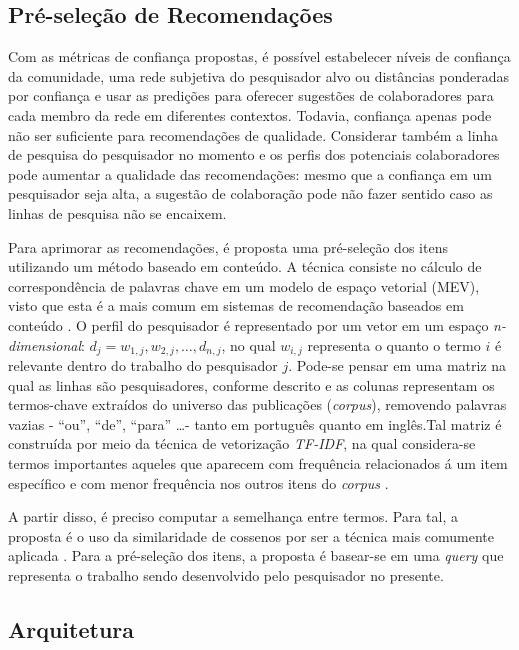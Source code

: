 \documentclass[12pt]{article}
\begin{document}
\subsection{Pré-seleção de Recomendações} \label{sect:pre-selection}

Com as métricas de confiança propostas, é possível estabelecer níveis de confiança da comunidade, uma rede subjetiva do pesquisador alvo ou distâncias ponderadas por confiança e usar as predições para oferecer sugestões de colaboradores para cada membro da rede em diferentes contextos. Todavia, confiança apenas pode não ser suficiente para recomendações de qualidade. Considerar também a linha de pesquisa do pesquisador no momento e os perfis dos potenciais colaboradores pode aumentar a qualidade das recomendações: mesmo que a confiança em um pesquisador seja alta, a sugestão de colaboração pode não fazer sentido caso as linhas de pesquisa não se encaixem.

Para aprimorar as recomendações, é proposta uma pré-seleção dos itens utilizando um método baseado em conteúdo. A técnica consiste no cálculo de correspondência de palavras chave em um modelo de espaço vetorial (MEV), visto que esta é a mais comum em sistemas de recomendação baseados em conteúdo \cite{ricci2011introduction}. O perfil do pesquisador é representado por um vetor em um espaço \textit{n-dimensional}: $d_j = {w_{1,j}, w_{2,j}, \dots ,d_{n,j}}$, no qual $w_{i,j}$ representa o quanto o termo $i$ é relevante dentro do trabalho do pesquisador $j$. Pode-se pensar em uma matriz na qual as linhas são pesquisadores, conforme descrito e as colunas representam os termos-chave extraídos do universo das publicações (\textit{corpus}), removendo palavras vazias - “ou”, “de”, “para” \dots - tanto em português quanto em inglês.Tal matriz é construída por meio da técnica de vetorização \textit{TF-IDF}, na qual considera-se termos importantes aqueles que aparecem com frequência relacionados á um item específico e com menor frequência nos outros itens do \textit{corpus} \cite{pazzani2007content}. 

A partir disso, é preciso computar a semelhança entre termos. Para tal, a proposta é o uso da similaridade de cossenos por ser a técnica mais comumente aplicada \cite{ricci2011introduction}. Para a pré-seleção dos itens, a proposta é basear-se em uma \textit{query} que representa o trabalho sendo desenvolvido pelo pesquisador no presente.

\subsection{Arquitetura} \label{sect:arch}
\end{document}
